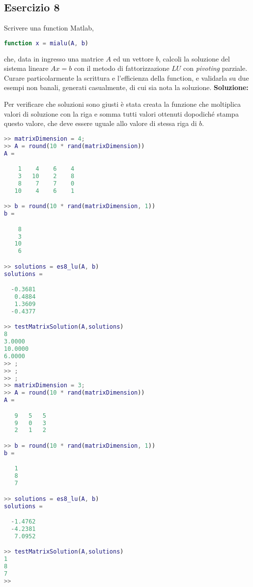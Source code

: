 \subsection{Esercizio 8}
Scrivere una function Matlab,
\begin{lstlisting}[language=Matlab]
function x = mialu(A, b)
\end{lstlisting}
che, data in ingresso una matrice $A$ ed un vettore $b$, calcoli la soluzione
del sistema lineare $Ax = b$ con il metodo di fattorizzazione $LU$ con \textit{pivoting} parziale.
Curare particolarmente la scrittura e l'efficienza della function,
e validarla su due esempi non banali, generati casualmente,
di cui sia nota la soluzione.
\newline \textbf{Soluzione:} \newline

Per verificare che soluzioni sono giusti è stata creata la funzione 
che moltiplica valori di soluzione con la riga e somma tutti valori ottenuti
dopodiché stampa questo valore, che deve essere uguale allo valore di stessa riga di $b$.
\begin{lstlisting}[language=Matlab]
>> matrixDimension = 4;
>> A = round(10 * rand(matrixDimension))
A =

    1    4    6    4
    3   10    2    8
    8    7    7    0
   10    4    6    1

>> b = round(10 * rand(matrixDimension, 1))
b =

    8
    3
   10
    6

>> solutions = es8_lu(A, b)
solutions =

  -0.3681
   0.4884
   1.3609
  -0.4377

>> testMatrixSolution(A,solutions)
8
3.0000
10.0000
6.0000
>> ;
>> ;
>> ;
>> matrixDimension = 3;
>> A = round(10 * rand(matrixDimension))
A =

   9   5   5
   9   0   3
   2   1   2

>> b = round(10 * rand(matrixDimension, 1))
b =

   1
   8
   7

>> solutions = es8_lu(A, b)
solutions =

  -1.4762
  -4.2381
   7.0952

>> testMatrixSolution(A,solutions)
1
8
7
>>
\end{lstlisting}

